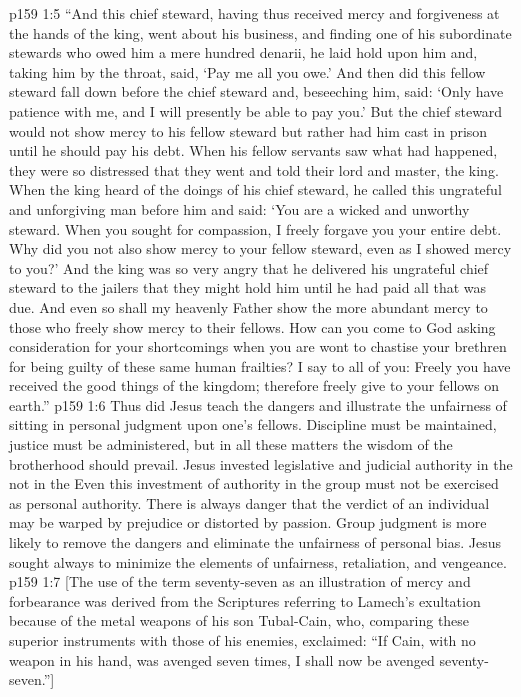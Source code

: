 \vs p159 1:5 \textcolor{ubdarkred}{“And this chief steward, having thus received mercy and forgiveness at the hands of the king, went about his business, and finding one of his subordinate stewards who owed him a mere hundred denarii, he laid hold upon him and, taking him by the throat, said, ‘Pay me all you owe.’ And then did this fellow steward fall down before the chief steward and, beseeching him, said: ‘Only have patience with me, and I will presently be able to pay you.’ But the chief steward would not show mercy to his fellow steward but rather had him cast in prison until he should pay his debt. When his fellow servants saw what had happened, they were so distressed that they went and told their lord and master, the king. When the king heard of the doings of his chief steward, he called this ungrateful and unforgiving man before him and said: ‘You are a wicked and unworthy steward. When you sought for compassion, I freely forgave you your entire debt. Why did you not also show mercy to your fellow steward, even as I showed mercy to you?’ And the king was so very angry that he delivered his ungrateful chief steward to the jailers that they might hold him until he had paid all that was due. And even so shall my heavenly Father show the more abundant mercy to those who freely show mercy to their fellows. How can you come to God asking consideration for your shortcomings when you are wont to chastise your brethren for being guilty of these same human frailties? I say to all of you: Freely you have received the good things of the kingdom; therefore freely give to your fellows on earth.”}
\pc \vs p159 1:6 Thus did Jesus teach the dangers and illustrate the unfairness of sitting in personal judgment upon one’s fellows. Discipline must be maintained, justice must be administered, but in all these matters the wisdom of the brotherhood should prevail. Jesus invested legislative and judicial authority in the  not in the  Even this investment of authority in the group must not be exercised as personal authority. There is always danger that the verdict of an individual may be warped by prejudice or distorted by passion. Group judgment is more likely to remove the dangers and eliminate the unfairness of personal bias. Jesus sought always to minimize the elements of unfairness, retaliation, and vengeance.
\pc \vs p159 1:7 [The use of the term seventy\hyp{}seven as an illustration of mercy and forbearance was derived from the Scriptures referring to Lamech’s exultation because of the metal weapons of his son Tubal\hyp{}Cain, who, comparing these superior instruments with those of his enemies, exclaimed: “If Cain, with no weapon in his hand, was avenged seven times, I shall now be avenged seventy\hyp{}seven.”]
